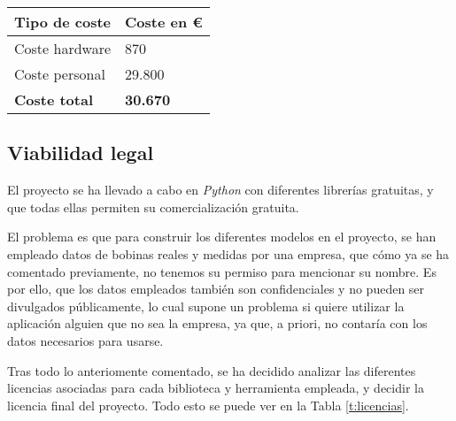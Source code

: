 \begin{center}
\begin{tabular}{|l|l|}
\hline
\textbf{Tipo de coste} & \textbf{Coste en €} \\ \hline
Coste hardware         & 870                 \\ \hline
Coste personal         & 29.800              \\ \hline
\textbf{Coste total}   & \textbf{30.670}     \\ \hline
\end{tabular}
\label{t:costot}
\end{center}

\subsection{Viabilidad legal}
El proyecto se ha llevado a cabo en \emph{Python} con diferentes librerías gratuitas, y que todas ellas permiten su comercialización gratuita. 

El problema es que para construir los diferentes modelos en el proyecto, se han empleado datos de bobinas reales y medidas por una empresa, que cómo ya se ha comentado previamente, no tenemos su permiso para mencionar su nombre. Es por ello, que los datos empleados también son confidenciales y no pueden ser divulgados públicamente, lo cual supone un problema si quiere utilizar la aplicación alguien que no sea la empresa, ya que, a priori, no contaría con los datos necesarios para usarse.

Tras todo lo anteriomente comentado, se ha decidido analizar las diferentes licencias asociadas para cada biblioteca y herramienta empleada, y decidir la licencia final del proyecto. Todo esto se puede ver en la Tabla \ref{t:licencias}.

